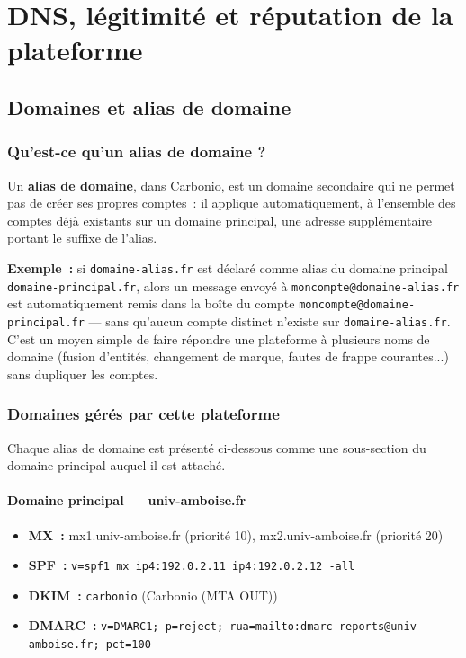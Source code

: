 \documentclass[11pt,a4paper]{report}
\begin{document}
\chapter{DNS, légitimité et réputation de la plateforme}

\section{Domaines et alias de domaine}

\subsection{Qu'est-ce qu'un alias de domaine ?}
Un \textbf{alias de domaine}, dans Carbonio, est un domaine secondaire qui ne permet pas de créer ses propres comptes~: il applique automatiquement, à l'ensemble des comptes déjà existants sur un domaine principal, une adresse supplémentaire portant le suffixe de l'alias.

\textbf{Exemple~:} si \texttt{domaine-alias.fr} est déclaré comme alias du domaine principal \texttt{domaine-principal.fr}, alors un message envoyé à \texttt{moncompte@domaine-alias.fr} est automatiquement remis dans la boîte du compte \texttt{moncompte@domaine-principal.fr} --- sans qu'aucun compte distinct n'existe sur \texttt{domaine-alias.fr}. C'est un moyen simple de faire répondre une plateforme à plusieurs noms de domaine (fusion d'entités, changement de marque, fautes de frappe courantes...) sans dupliquer les comptes.

\subsection{Domaines gérés par cette plateforme}
Chaque alias de domaine est présenté ci-dessous comme une sous-section du domaine principal auquel il est attaché.

\subsubsection{Domaine principal --- univ-\allowbreak{}amboise.\allowbreak{}fr}
\begin{itemize}[nosep]
  \item \textbf{MX~:} mx1.\allowbreak{}univ-\allowbreak{}amboise.\allowbreak{}fr (priorité 10), mx2.\allowbreak{}univ-\allowbreak{}amboise.\allowbreak{}fr (priorité 20)  \item \textbf{SPF~:} \texttt{v=spf1 mx ip4:192.\allowbreak{}0.\allowbreak{}2.\allowbreak{}11 ip4:192.\allowbreak{}0.\allowbreak{}2.\allowbreak{}12 -\allowbreak{}all}  \item \textbf{DKIM~:} \texttt{carbonio} (Carbonio (MTA OUT))  \item \textbf{DMARC~:} \texttt{v=DMARC1; p=reject; rua=mailto:dmarc-\allowbreak{}reports@univ-\allowbreak{}amboise.\allowbreak{}fr; pct=100}\end{itemize}
\end{document}
